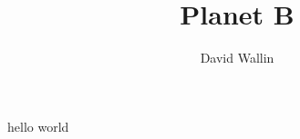 \documentclass[12pt, a4paper]{memoir}
\title{Planet B}
\author{David Wallin}
\date{}
\begin{document}
\maketitle
\mainmatter
hello world
\end{document}
